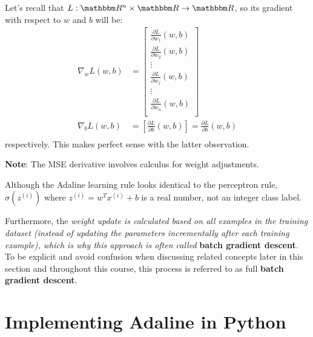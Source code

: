 \documentclass[../machine_learning_scikit.tex]{subfiles}
\begin{document}
    \begin{obs}
        Let's recall that $\cf{L}{\bbm{R}^{n}\times\bbm{R}}{\bbm{R}}$, so its gradient with respect to $w$ and $b$ will be:
        \begin{equation*}
            \begin{split}
                \nabla_{w}L(w,b)&=\left[
                    \begin{array}{c}
                        \frac{\partial L}{\partial w_1}(w,b) \\
                        \frac{\partial L}{\partial w_2}(w,b) \\
                        \vdots \\
                        \frac{\partial L}{\partial w_j}(w,b) \\
                        \vdots \\
                        \frac{\partial L}{\partial w_n}(w,b) \\
                    \end{array}
                \right]\\
                \nabla_{b}L(w,b)&=\left[\frac{\partial L}{\partial b}(w,b) \right]=\frac{\partial L}{\partial b}(w,b)\\
            \end{split}
        \end{equation*}
        respectively. This makes perfect sense with the latter observation.
    \end{obs}

    \textbf{Note}: The MSE derivative involves calculus for weight adjustments.  

    \begin{obs}
        Although the Adaline learning rule looks identical to the perceptron rule, $\sigma(z^{(i)})$ where $z^{(i)}=w^Tx^{(i)}+b$ is a real number, not an integer class label.

        Furthermore, the \textit{weight update is calculated based on all examples in the training dataset (instead of updating the parameters incrementally after each training example), which is why this approach is often called} \textbf{batch gradient descent}. To be explicit and avoid confusion when discussing related concepts later in this section and throughout this course, this process is referred to as full \textbf{batch gradient descent}.
    \end{obs}

    \section{Implementing Adaline in Python}
\end{document}
